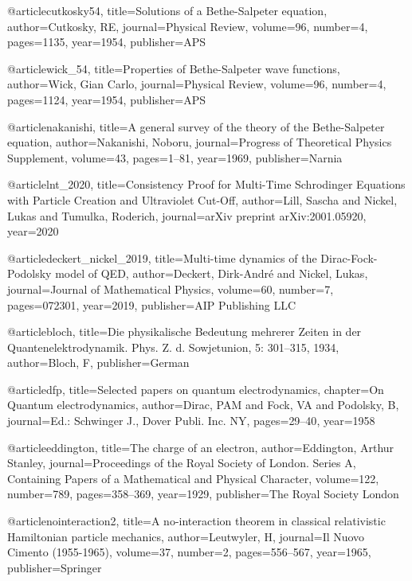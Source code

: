 @article{cutkosky54,
  title={Solutions of a Bethe-Salpeter equation},
  author={Cutkosky, RE},
  journal={Physical Review},
  volume={96},
  number={4},
  pages={1135},
  year={1954},
  publisher={APS}
}

@article{wick_54,
  title={Properties of Bethe-Salpeter wave functions},
  author={Wick, Gian Carlo},
  journal={Physical Review},
  volume={96},
  number={4},
  pages={1124},
  year={1954},
  publisher={APS}
}

@article{nakanishi,
  title={A general survey of the theory of the Bethe-Salpeter equation},
  author={Nakanishi, Noboru},
  journal={Progress of Theoretical Physics Supplement},
  volume={43},
  pages={1--81},
  year={1969},
  publisher={Narnia}
}



@article{lnt_2020,
  title={Consistency Proof for Multi-Time Schrodinger Equations with Particle Creation and Ultraviolet Cut-Off},
  author={Lill, Sascha and Nickel, Lukas and Tumulka, Roderich},
  journal={arXiv preprint arXiv:2001.05920},
  year={2020}
}

@article{deckert_nickel_2019,
  title={Multi-time dynamics of the Dirac-Fock-Podolsky model of QED},
  author={Deckert, Dirk-Andr{\'e} and Nickel, Lukas},
  journal={Journal of Mathematical Physics},
  volume={60},
  number={7},
  pages={072301},
  year={2019},
  publisher={AIP Publishing LLC}
}


@article{bloch,
  title={Die physikalische Bedeutung mehrerer Zeiten in der Quantenelektrodynamik. Phys. Z. d. Sowjetunion, 5: 301--315, 1934},
  author={Bloch, F},
  publisher={German}
}

@article{dfp,
  title={Selected papers on quantum electrodynamics},
  chapter={On Quantum electrodynamics},
  author={Dirac, PAM and Fock, VA and Podolsky, B},
  journal={Ed.: Schwinger J., Dover Publi. Inc. NY},
  pages={29--40},
  year={1958}
}


@article{eddington,
  title={The charge of an electron},
  author={Eddington, Arthur Stanley},
  journal={Proceedings of the Royal Society of London. Series A, Containing Papers of a Mathematical and Physical Character},
  volume={122},
  number={789},
  pages={358--369},
  year={1929},
  publisher={The Royal Society London}
}

@article{nointeraction2,
  title={A no-interaction theorem in classical relativistic Hamiltonian particle mechanics},
  author={Leutwyler, H},
  journal={Il Nuovo Cimento (1955-1965)},
  volume={37},
  number={2},
  pages={556--567},
  year={1965},
  publisher={Springer}
}

